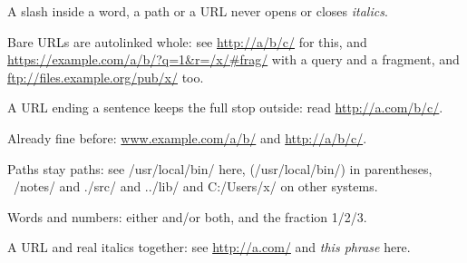 A slash inside a word, a path or a URL never opens or closes \emph{italics}.

Bare URLs are autolinked whole: see \href{http://a/b/c/}{http://a/b/c/} for this, and
\href{https://example.com/a/b/?q=1\&r=/x/\#frag/}{https://example.com/a/b/?q=1\&r=/x/\#frag/} with a query and a fragment, and
\href{ftp://files.example.org/pub/x/}{ftp://files.example.org/pub/x/} too.

A URL ending a sentence keeps the full stop outside: read \href{http://a.com/b/c/}{http://a.com/b/c/}.

Already fine before: \href{http://www.example.com/a/b/}{www.example.com/a/b/} and \href{http://a/b/c/}{http://a/b/c/}.

Paths stay paths: see /usr/local/bin/ here, (/usr/local/bin/) in parentheses,
~/notes/ and ./src/ and ../lib/ and C:/Users/x/ on other systems.

Words and numbers: either and/or both, and the fraction 1/2/3.

A URL and real italics together: see \href{http://a.com/}{http://a.com/} and \emph{this phrase} here.

